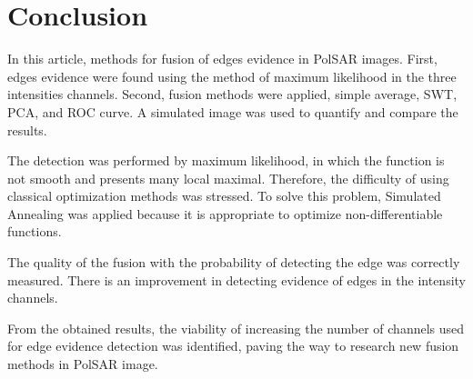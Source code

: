 \documentclass[conference]{IEEEtran}
\begin{document}
\section{Conclusion}\label{sec_09}

In this article, methods for fusion of edges evidence in PolSAR images. 
First, edges evidence were found using the method of maximum likelihood in the three intensities channels. 
Second, fusion methods were applied, simple average, SWT, PCA, and ROC curve. A simulated image was used to quantify and compare the results. 

The detection was performed by maximum likelihood, in which the function is not smooth and presents many local maximal.
Therefore, the difficulty of using classical optimization methods was stressed. 
To solve this problem, Simulated Annealing was applied because it is appropriate to optimize non-differentiable functions.

The quality of the fusion with the probability of detecting the edge was correctly measured. There is an improvement in detecting evidence of edges in the intensity channels.

From the obtained results, the viability of increasing the number of channels used for edge evidence detection was identified, paving the way to research new fusion methods in PolSAR image.



\end{document}
